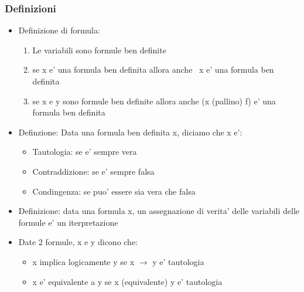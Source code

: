 \documentclass{article}
\begin{document}
\begin{flushleft}
     \subsubsection{Definizioni}
     \begin{itemize}
       \item Definizione di formula:
           \begin{enumerate}
            \item Le variabili sono formule ben definite
            \item se x e' una formula ben definita allora anche ~x e' una formula ben definita
            \item se x e y sono formule ben definite allora anche (x (pallino) f) e' una formula ben definita
           \end{enumerate}
       \item Definzione: Data una formula ben definita x, diciamo che x e':
           \begin{itemize}
            \item Tautologia: se e' sempre vera
            \item Contraddizione: se e' sempre falsa
            \item Condingenza: se puo' essere sia vera che falsa
           \end{itemize}
        \item Definizione: data una formula x, un assegnazione di verita' delle variabili delle formule e' un iterpretazione
        \item Date 2 formule, x e y dicono che:
            \begin{itemize}
               \item x implica logicamente y se x $\to$ y e' tautologia
               \item x e' equivalente a y se x (equivalente) y e' tautologia
            \end{itemize}
       \end{itemize}
    \end{flushleft}
\end{document}

